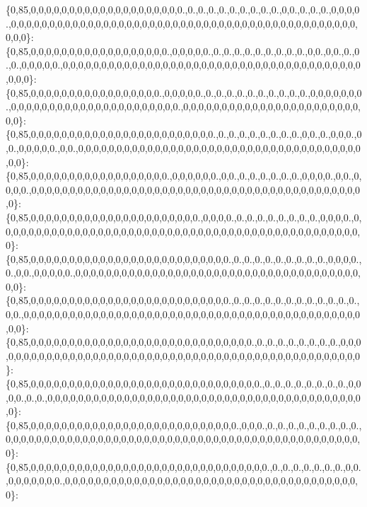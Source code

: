 \{0,85,0,0,0,0,0,0,0,0,0,0,0,0,0,0,0,0,0,0,0,0.,0.,0.,0.,0.,0.,0.,0.,0.,0.,0,0.,0.,0.,0.,0,0,0,0.,0,0,0,0,0,0,0,0,0,0,0,0,0,0,0,0,0,0,0,0,0,0,0,0,0,0,0,0,0,0,0,0,0,0,0,0,0,0,0,0,0,0,0,0,0,0,0,0\}\+: \{0,85,0,0,0,0,0,0,0,0,0,0,0,0,0,0,0,0,0,0.,0,0,0,0,0.,0.,0.,0.,0.,0.,0.,0.,0.,0.,0,0.,0,0.,0.,0.,0.,0,0,0,0,0.,0,0,0,0,0,0,0,0,0,0,0,0,0,0,0,0,0,0,0,0,0,0,0,0,0,0,0,0,0,0,0,0,0,0,0,0,0,0,0,0,0,0\}\+: \{0,85,0,0,0,0,0,0,0,0,0,0,0,0,0,0,0,0,0.,0,0,0,0,0.,0.,0.,0.,0.,0.,0.,0.,0.,0.,0.,0,0,0,0,0,0,0.,0,0,0,0,0,0,0,0,0,0,0,0,0,0,0,0,0,0,0,0,0,0.,0,0,0,0,0,0,0,0,0,0,0,0,0,0,0,0,0,0,0,0,0,0,0,0,0\}\+: \{0,85,0,0,0,0,0,0,0,0,0,0,0,0,0,0,0,0,0,0,0,0,0,0,0,0.,0.,0.,0.,0.,0.,0.,0.,0.,0,0.,0.,0,0,0.,0,0.,0,0,0,0,0.,0,0.,0,0,0,0,0,0,0,0,0,0,0,0,0,0,0,0,0,0,0,0,0,0,0,0,0,0,0,0,0,0,0,0,0,0,0,0,0,0,0\}\+: \{0,85,0,0,0,0,0,0,0,0,0,0,0,0,0,0,0,0,0,0.,0,0,0,0,0,0.,0,0.,0.,0.,0.,0.,0.,0.,0,0,0,0.,0,0.,0,0,0,0.,0,0,0,0,0,0,0,0,0,0,0,0,0,0,0,0,0,0,0,0,0,0,0,0,0,0,0,0,0,0,0,0,0,0,0,0,0,0,0,0,0,0,0,0\}\+: \{0,85,0,0,0,0,0,0,0,0,0,0,0,0,0,0,0,0,0,0,0,0,0,0.,0,0,0,0.,0.,0.,0.,0.,0.,0.,0.,0.,0,0,0,0.,0,0,0,0,0,0,0,0,0,0,0,0,0,0,0,0,0,0,0,0,0,0,0,0,0,0,0,0,0,0,0,0,0,0,0,0,0,0,0,0,0,0,0,0,0,0,0,0\}\+: \{0,85,0,0,0,0,0,0,0,0,0,0,0,0,0,0,0,0,0,0,0,0,0,0,0,0,0,0.,0.,0.,0.,0.,0.,0.,0.,0.,0.,0,0,0,0.,0.,0,0.,0,0,0,0,0.,0,0,0,0,0,0,0,0,0,0,0,0,0,0,0,0,0,0,0,0,0,0,0,0,0,0,0,0,0,0,0,0,0,0,0,0,0,0,0\}\+: \{0,85,0,0,0,0,0,0,0,0,0,0,0,0,0,0,0,0,0,0,0,0,0,0,0,0,0,0.,0.,0.,0.,0.,0.,0.,0.,0.,0.,0.,0.,0.,0,0.,0,0,0,0,0,0,0,0,0,0,0,0,0,0,0,0,0,0,0,0,0,0,0,0,0,0,0,0,0,0,0,0,0,0,0,0,0,0,0,0,0,0,0,0,0,0\}\+: \{0,85,0,0,0,0,0,0,0,0,0,0,0,0,0,0,0,0,0,0,0,0,0,0,0,0,0,0,0,0,0.,0.,0.,0.,0.,0.,0.,0.,0.,0,0,0,0,0,0,0,0,0,0,0,0,0,0,0,0,0,0,0,0,0,0,0,0,0,0,0,0,0,0,0,0,0,0,0,0,0,0,0,0,0,0,0,0,0,0,0,0,0\}\+: \{0,85,0,0,0,0,0,0,0,0,0,0,0,0,0,0,0,0,0,0,0,0,0,0,0,0,0,0,0,0,0,0.,0.,0.,0.,0.,0.,0.,0.,0.,0,0,0,0.,0.,0.,0,0,0,0,0,0,0,0,0,0,0,0,0,0,0,0,0,0,0,0,0,0,0,0,0,0,0,0,0,0,0,0,0,0,0,0,0,0,0,0,0,0\}\+: \{0,85,0,0,0,0,0,0,0,0,0,0,0,0,0,0,0,0,0,0,0,0,0,0,0,0,0,0,0.,0,0,0.,0.,0.,0.,0.,0.,0.,0.,0.,0.,0,0,0,0,0,0,0,0,0,0,0,0,0,0,0,0,0,0,0,0,0,0,0,0,0,0,0,0,0,0,0,0,0,0,0,0,0,0,0,0,0,0,0,0,0,0,0\}\+: \{0,85,0,0,0,0,0,0,0,0,0,0,0,0,0,0,0,0,0,0,0,0,0,0,0,0,0,0,0,0,0,0,0.,0.,0.,0.,0.,0.,0.,0.,0,0.,0,0,0,0,0,0,0.,0,0,0,0,0,0,0,0,0,0,0,0,0,0,0,0,0,0,0,0,0,0,0,0,0,0,0,0,0,0,0,0,0,0,0,0,0,0,0\}\+: 